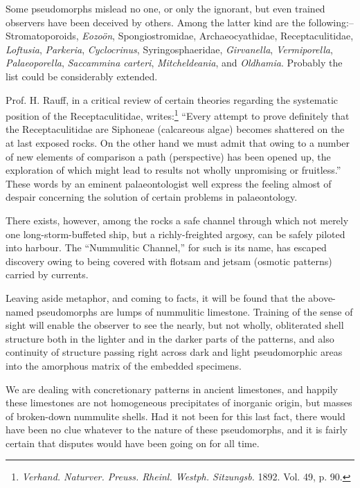 \documentclass[a4paper, 12pt, oneside, landscape]{article}
\begin{document}
Some pseudomorphs mislead no one, or only the ignorant, but even trained observers have been deceived by others. Among the latter kind are the following:-- Stromatoporoids, \emph{Eozoön}, Spongiostromidae, Archaeocyathidae, Receptaculitidae, \emph{Loftusia}, \emph{Parkeria}, \emph{Cyclocrinus}, Syringosphaeridae, \emph{Girvanella}, \emph{Vermiporella}, \emph{Palaeoporella}, \emph{Saccammina carteri}, \emph{Mitcheldeania}, and \emph{Oldhamia}. Probably the list could be considerably extended.

Prof. H. Rauff, in a critical review of certain theories regarding the systematic position of the Receptaculitidae, writes:\footnote{\emph{Verhand. Naturver. Preuss. Rheinl. Westph. Sitzungsb.} 1892. Vol. 49, p. 90.} ``Every attempt to prove definitely that the Receptaculitidae are Siphoneae (calcareous algae) becomes shattered on the at last exposed rocks. On the other hand we must admit that owing to a number of new elements of comparison a path (perspective) has been opened up, the exploration of which might lead to results not wholly unpromising or fruitless.'' These words by an eminent palaeontologist well express the feeling almost of despair concerning the solution of certain problems in palaeontology.

There exists, however, among the rocks a safe channel through which not merely one long-storm-buffeted ship, but a richly-freighted argosy, can be safely piloted into harbour. The ``Nummulitic Channel,'' for such is its name, has escaped discovery owing to being covered with flotsam and jetsam (osmotic patterns) carried by currents.

Leaving aside metaphor, and coming to facts, it will be found that the above-named pseudomorphs are lumps of nummulitic limestone. Training of the sense of sight will enable the observer to see the nearly, but not wholly, obliterated shell structure both in the lighter and in the darker parts of the patterns, and also continuity of structure passing right across dark and light pseudomorphic areas into the amorphous matrix of the embedded specimens.

We are dealing with concretionary patterns in ancient limestones, and happily these limestones are not homogeneous precipitates of inorganic origin, but masses of broken-down nummulite shells. Had it not been for this last fact, there would have been no clue whatever to the nature of these pseudomorphs, and it is fairly certain that disputes would have been going on for all time.
\end{document}
